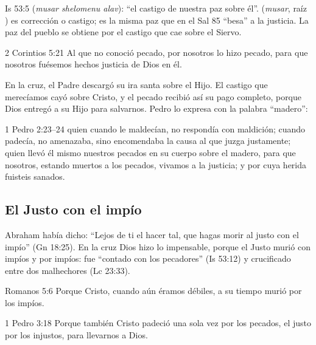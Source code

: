\begin{filologiatexto}{Is 53:5}
 (\emph{musar shelomenu alav}): ``el castigo de nuestra paz sobre él''.  (\emph{musar}, raíz ) es corrección o castigo;  es la misma paz que en el Sal 85 ``besa'' a la justicia. La paz del pueblo se obtiene por el castigo que cae sobre el Siervo.
\end{filologiatexto}

\begin{verso}{2 Corintios 5:21}
Al que no conoció pecado, por nosotros lo hizo pecado, para que nosotros fuésemos hechos justicia de Dios en él.
\end{verso}

En la cruz, el Padre descargó su ira santa sobre el Hijo. El castigo que merecíamos cayó sobre Cristo, y el pecado recibió así su pago completo, porque Dios entregó a su Hijo para salvarnos. Pedro lo expresa con la palabra ``madero'':

\begin{verso}{1 Pedro 2:23–24}
quien cuando le maldecían, no respondía con maldición; cuando padecía, no amenazaba, sino encomendaba la causa al que juzga justamente; quien llevó él mismo nuestros pecados en su cuerpo sobre el madero, para que nosotros, estando muertos a los pecados, vivamos a la justicia; y por cuya herida fuisteis sanados.
\end{verso}


\subsection{El Justo con el impío}
Abraham había dicho: ``Lejos de ti el hacer tal, que hagas morir al justo con el impío'' (Gn 18:25). En la cruz Dios hizo lo impensable, porque el Justo murió con impíos y por impíos: fue ``contado con los pecadores'' (Is 53:12) y crucificado entre dos malhechores (Lc 23:33).

\begin{verso}{Romanos 5:6}
Porque Cristo, cuando aún éramos débiles, a su tiempo murió por los impíos.
\end{verso}

\begin{verso}{1 Pedro 3:18}
Porque también Cristo padeció una sola vez por los pecados, el justo por los injustos, para llevarnos a Dios.
\end{verso}

